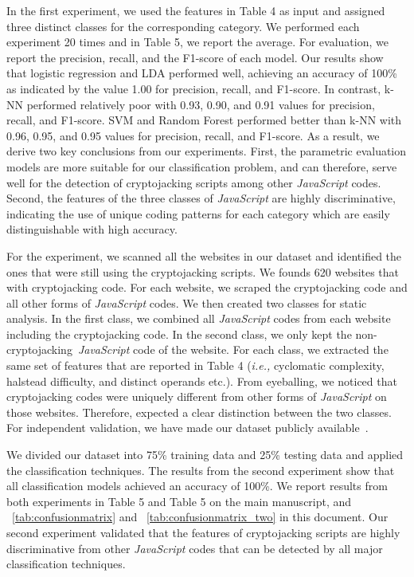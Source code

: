 \documentclass{abmart}
\newcommand{\js}{{\em JavaScript}\xspace}
\newcommand{\etc}{{etc.}\xspace}
\newcommand{\ie}{{\em i.e.,}\xspace}
\newcommand{\cj}{cryptojacking\xspace}
\begin{document}
{In the first experiment, we used the features in Table 4 as input and assigned three distinct classes for the corresponding category. We performed each experiment 20 times and in Table 5, we report the average. For evaluation, we report the precision, recall, and the F1-score of each model. Our results show that logistic regression and LDA performed well, achieving an accuracy of 100\% as indicated by the value 1.00 for precision, recall, and F1-score. In contrast, k-NN performed relatively poor with 0.93, 0.90, and 0.91 values for precision, recall, and F1-score. SVM and Random Forest performed better than k-NN with 0.96, 0.95, and 0.95 values for precision, recall, and F1-score. As a result, we derive two key conclusions from our experiments. First, the parametric evaluation models are more suitable for our classification problem, and can therefore, serve well for the detection of \cj scripts among other \js codes. Second, the features of the three classes of \js are highly discriminative, indicating the use of unique coding patterns for each category which are easily distinguishable with high accuracy.

For the experiment, we scanned all the websites in our dataset and identified the ones that were still using the \cj scripts. We founds 620 websites that with \cj code. For each website, we scraped the \cj code and all other forms of \js codes. We then created two classes for static analysis. In the first class, we combined all \js codes from each website including the \cj code. In the second class, we only kept the non-\cj~\js code of the website. For each class, we extracted the same set of features that are reported in Table 4 (\ie cyclomatic complexity, halstead difficulty, and distinct operands \etc). From eyeballing, we noticed that \cj codes were uniquely different from other forms of \js on those websites. Therefore, expected a clear distinction between the two classes. For independent validation, we have made our dataset publicly available~\cite{Saad20}.

We divided our dataset into 75\% training data and 25\% testing data and applied the classification techniques. The results from the second experiment show that all classification models achieved an accuracy of 100\%. We report results from both experiments in Table 5 and Table 5 on the main manuscript, and ~\autoref{tab:confusionmatrix} and ~\autoref{tab:confusionmatrix_two} in this document. Our second experiment validated that the features of \cj scripts are highly discriminative from other \js codes that can be detected by all major classification techniques. }
\end{document}
